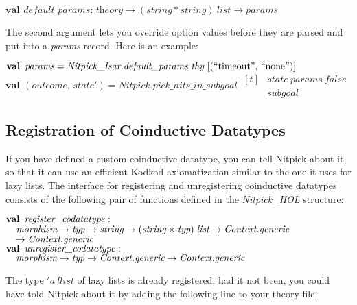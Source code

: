 \documentclass[a4paper,12pt]{article}
\begin{document}
\prew
$\textbf{val}\,~\textit{default\_params} :\,
\textit{theory} \rightarrow (\textit{string} * \textit{string})~\textit{list} \rightarrow \textit{params}$
\postw

The second argument lets you override option values before they are parsed and
put into a \textit{params} record. Here is an example:

\prew
$\textbf{val}\,~\textit{params} = \textit{Nitpick\_Isar.default\_params}~\textit{thy}~[(\textrm{``}\textrm{timeout\/}\textrm{''},\, \textrm{``}\textrm{none}\textrm{''})]$ \\
$\textbf{val}\,~(\textit{outcome},\, \textit{state}') = \textit{Nitpick.pick\_nits\_in\_subgoal}~\begin{aligned}[t]
& \textit{state}~\textit{params}~\textit{false} \\[-2pt]
& \textit{subgoal}\end{aligned}$
\postw

\let\antiq=\textrm

\subsection{Registration of Coinductive Datatypes}
\label{registration-of-coinductive-datatypes}

If you have defined a custom coinductive datatype, you can tell Nitpick about
it, so that it can use an efficient Kodkod axiomatization similar to the one it
uses for lazy lists. The interface for registering and unregistering coinductive
datatypes consists of the following pair of functions defined in the
\textit{Nitpick\_HOL} structure:

\prew
$\textbf{val}\,~\textit{register\_codatatype\/} : {}$ \\
$\hbox{}\quad\textit{morphism} \rightarrow \textit{typ} \rightarrow \textit{string} \rightarrow (\textit{string} \times \textit{typ})\;\textit{list} \rightarrow \textit{Context.generic} {}$ \\
$\hbox{}\quad{\rightarrow}\; \textit{Context.generic}$ \\
$\textbf{val}\,~\textit{unregister\_codatatype\/} : {}$ \\
$\hbox{}\quad\textit{morphism} \rightarrow \textit{typ} \rightarrow \textit{Context.generic} \rightarrow \textit{Context.generic} {}$
\postw

The type $'a~\textit{llist}$ of lazy lists is already registered; had it
not been, you could have told Nitpick about it by adding the following line
to your theory file:
\end{document}
